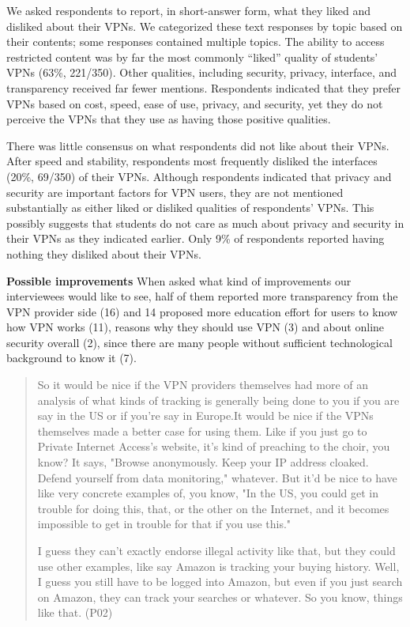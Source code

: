 We asked respondents to report, in short-answer form, what they liked and
disliked about their VPNs. We categorized these text responses by topic based
on their contents; some responses contained multiple topics. The ability to
access restricted content was by far the most commonly “liked” quality of
students’ VPNs (63\%, 221/350). Other qualities, including security, privacy,
interface, and transparency received far fewer mentions. Respondents indicated
that they prefer VPNs based on cost, speed, ease of use, privacy, and
security, yet they do not perceive the VPNs that they use as having those
positive qualities.

There was little consensus on what respondents did not like about their VPNs.
After speed and stability, respondents most frequently disliked the interfaces
(20\%, 69/350) of their VPNs. Although respondents indicated that privacy and
security are important factors for VPN users, they are not mentioned
substantially as either liked or disliked qualities of respondents’ VPNs. This
possibly suggests that students do not care as much about privacy and security
in their VPNs as they indicated earlier. Only 9\% of respondents reported
having nothing they disliked about their VPNs.



\textbf{Possible improvements} When asked what kind of improvements our
interviewees would like to see, half of them reported more transparency from
the VPN provider side (16) and 14 proposed more education effort for users to
know how VPN works (11), reasons why they should use VPN (3) and about online
security overall (2), since there are many people without sufficient
technological background to know it (7). 

\begin{quote}So it would be nice if the VPN providers themselves had more of
    an analysis of what kinds of tracking is generally being done to you if
    you are say in the US or if you're say in Europe.It would be nice if the
    VPNs themselves made a better case for using them. Like if you just go to
    Private Internet Access's website, it's kind of preaching to the choir,
    you know? It says, "Browse anonymously. Keep your IP address cloaked.
    Defend yourself from data monitoring," whatever. But it'd be nice to have
    like very concrete examples of, you know, "In the US, you could get in
    trouble for doing this, that, or the other on the Internet, and it becomes
    impossible to get in trouble for that if you use this."

I guess they can't exactly endorse illegal activity like that, but they could
use other examples, like say Amazon is tracking your buying history. Well, I
guess you still have to be logged into Amazon, but even if you just search on
Amazon, they can track your searches or whatever. So you know, things like
that. (P02)\end{quote}


